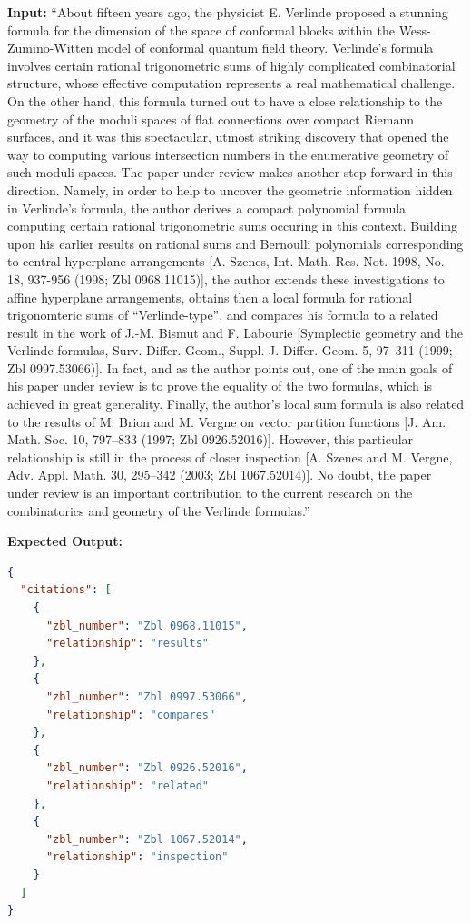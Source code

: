 \documentclass[sigconf,anonymous]{acmart}
\begin{document}
\textbf{Input:} ``About fifteen years ago, the physicist E. Verlinde proposed a stunning formula for the dimension of the space of conformal blocks within the Wess-Zumino-Witten model of conformal quantum field theory. Verlinde's formula involves certain rational trigonometric sums of highly complicated combinatorial structure, whose effective computation represents a real mathematical challenge. On the other hand, this formula turned out to have a close relationship to the geometry of the moduli spaces of flat connections over compact Riemann surfaces, and it was this spectacular, utmost striking discovery that opened the way to computing various intersection numbers in the enumerative geometry of such moduli spaces. The paper under review makes another step forward in this direction. Namely, in order to help to uncover the geometric information hidden in Verlinde's formula, the author derives a compact polynomial formula computing certain rational trigonometric sums occuring in this context. Building upon his earlier results on rational sums and Bernoulli polynomials corresponding to central hyperplane arrangements [A. Szenes, Int. Math. Res. Not. 1998, No. 18, 937-956 (1998; Zbl 0968.11015)], the author extends these investigations to affine hyperplane arrangements, obtains then a local formula for rational trigonomteric sums of ``Verlinde-type'', and compares his formula to a related result in the work of J.-M. Bismut and F. Labourie [Symplectic geometry and the Verlinde formulas, Surv. Differ. Geom., Suppl. J. Differ. Geom. 5, 97–311 (1999; Zbl 0997.53066)]. In fact, and as the author points out, one of the main goals of his paper under review is to prove the equality of the two formulas, which is achieved in great generality. Finally, the author's local sum formula is also related to the results of M. Brion and M. Vergne on vector partition functions [J. Am. Math. Soc. 10, 797–833 (1997; Zbl 0926.52016)]. However, this particular relationship is still in the process of closer inspection [A. Szenes and M. Vergne, Adv. Appl. Math. 30, 295–342 (2003; Zbl 1067.52014)]. No doubt, the paper under review is an important contribution to the current research on the combinatorics and geometry of the Verlinde formulas.''

\textbf{Expected Output:}
\begin{lstlisting}[language=json]
{
  "citations": [
    {
      "zbl_number": "Zbl 0968.11015",
      "relationship": "results"
    },
    {
      "zbl_number": "Zbl 0997.53066",
      "relationship": "compares"
    },
    {
      "zbl_number": "Zbl 0926.52016",
      "relationship": "related"
    },
    {
      "zbl_number": "Zbl 1067.52014",
      "relationship": "inspection"
    }
  ]
}
\end{lstlisting}
\end{document}
